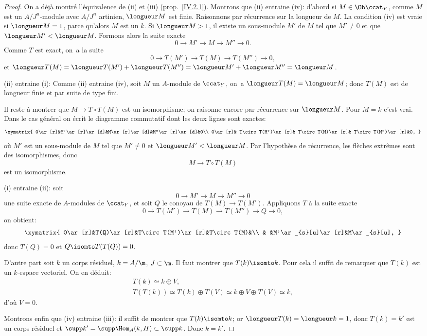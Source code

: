 \begin{proof}
On a d\'ej\`a montr\'e l'\'equivalence de (ii) et (iii) (prop.\, \ref{IV.2.1}). Montrons que (ii) entraine (iv): d'abord si $M\in \Ob \ccat_{Y}$, comme $M$ est un $A/J^{n}$-module avec $A/J^{n}$ artinien, $\longueur M$ est finie. Raisonnons par r\'ecurrence sur la longueur de $M$. La condition (iv) est vraie si $\longueur M=1$, parce qu'alors $M$ est un $k$. Si $\longueur M>1$, il existe un sous-module $M'$ de $M$ tel que $M'\neq 0$ et que $\longueur M'<\longueur M$. Formons alors la suite exacte
$$
0\to M'\to M\to M''\to 0.
$$
Comme $T$ est exact, on~a la suite
$$
0\to T(M')\to T(M)\to T(M'')\to 0,
$$
et $\longueur T(M)=\longueur T(M')+\longueur T(M'')=\longueur M'+\longueur M''=\longueur M$.

(ii) entraine (i): Comme (ii) entraine (iv), soit $M$ un $A$-module de $\ccat_{Y}$, on~a $\longueur T(M)=\longueur M$; donc $T(M)$ est de longueur finie et par suite de type fini.

Il reste \`a montrer que $M\to T\circ T(M)$ est un isomorphisme; on raisonne encore par r\'ecurrence sur $\longueur M$. Pour $M=k$ c'est vrai. Dans le cas g\'en\'eral on \'ecrit le diagramme commutatif dont les deux lignes sont exactes:
$$
\xymatrix{ 0\ar[r]&M'\ar[r]\ar[d]&M\ar[r]\ar[d]&M''\ar[r]\ar[d]&0\\
0\ar[r]& T\circ T(M')\ar[r]& T\circ T(M)\ar[r]& T\circ T(M'')\ar[r]&0, }
$$
o\`u $M'$ est un sous-module de $M$ tel que $M'\neq 0$ et $\longueur M'<\longueur M$. Par l'hypoth\`ese de r\'ecurrence, les fl\`eches extr\^emes sont des isomorphismes, donc
$$
M\to T\circ T(M)
$$
est un isomorphisme.

(i) entraine (ii): soit
$$
0\to M'\to M\to M''\to 0
$$
une suite exacte de $A$-modules de $\ccat_{Y}$, et soit $Q$ le conoyau de $T(M)\to T(M')$. Appliquons $T$ \`a la suite exacte
$$
0\to T(M')\to T(M)\to T(M'')\to Q \to 0,
$$
on obtient:
$$
\xymatrix{
0\ar[r]&T(Q)\ar[r]&T\circ T(M')\ar[r]&T\circ T(M)&\\
& &M'\ar_{s}[u]\ar[r]&M\ar_{s}[u],
}
$$
donc $T(Q)=0$ et $Q\isomto T(T(Q))=0$.

D'autre part soit $k$ un corps r\'esiduel, $k=A/\m$, $J\subset \m$. Il faut montrer que $T(k)\isomto k$. Pour cela il suffit de remarquer que $T(k)$ est un $k$-espace vectoriel. On en d\'eduit:
\begin{gather*}
T(k)\simeq k\oplus V,\\
T(T(k))\simeq T(k)\oplus T(V)\simeq k\oplus V\oplus T(V)\simeq k,
\end{gather*}
d'o\`u $V=0$.

Montrons enfin que (iv) entraine (iii): il suffit de montrer que $T(k)\isomto k$; or $\longueur T(k)= \longueur k=1$, donc $T(k)=k'$ est un corps r\'esiduel et $\supp k'= \supp \Hom_{A}(k, H)\subset \supp k$. Donc $k=k'$.
\skipqed
\end{proof}

